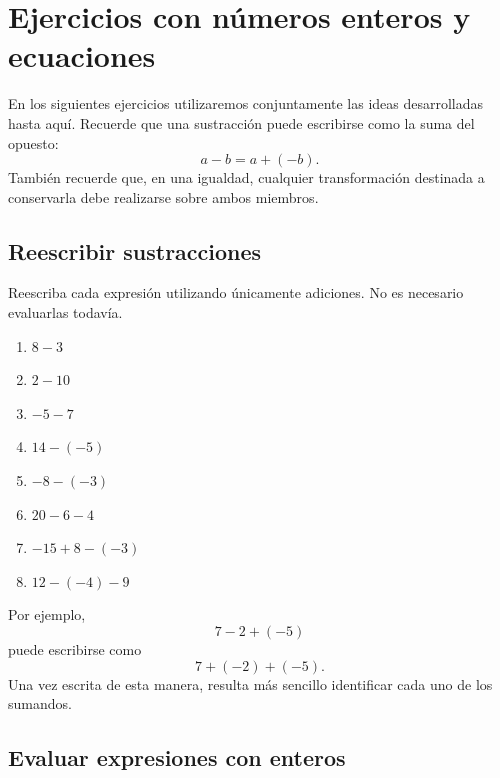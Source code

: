 \section[Práctica con enteros y ecuaciones]{Ejercicios con números enteros y ecuaciones}

En los siguientes ejercicios utilizaremos conjuntamente las ideas desarrolladas hasta aquí. Recuerde que una sustracción puede escribirse como la suma del opuesto:
\[
a-b=a+(-b).
\]
También recuerde que, en una igualdad, cualquier transformación destinada a conservarla debe realizarse sobre ambos miembros.

\subsection*{Reescribir sustracciones}

Reescriba cada expresión utilizando únicamente adiciones. No es necesario evaluarlas todavía.
\begin{enumerate}
\item \(8-3\)

\item \(2-10\)

\item \(-5-7\)

\item \(14-(-5)\)

\item \(-8-(-3)\)

\item \(20-6-4\)

\item \(-15+8-(-3)\)

\item \(12-(-4)-9\)
\end{enumerate}
Por ejemplo,
\[
7-2+(-5)
\]
puede escribirse como
\[
7+(-2)+(-5).
\]
Una vez escrita de esta manera, resulta más sencillo identificar cada uno de los sumandos.

\subsection*{Evaluar expresiones con enteros}

